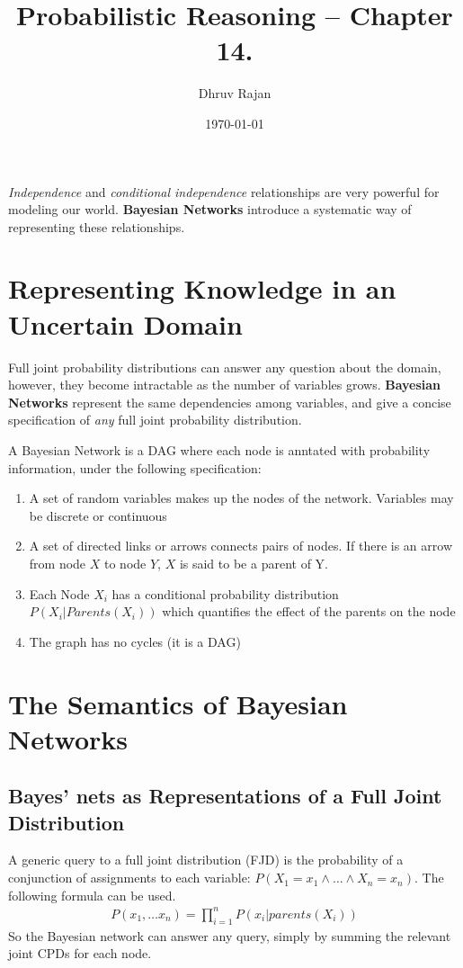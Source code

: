 \documentclass[12pt]{article}
\begin{document}
\title{Probabilistic Reasoning -- Chapter 14.}
\author{Dhruv Rajan}
\date{\today}
\maketitle

\textit{Independence} and \textit{conditional independence}
relationships are very powerful for modeling our
world. \textbf{Bayesian Networks} introduce a systematic way of
representing these relationships.

\section{Representing Knowledge in an Uncertain Domain}
Full joint probability distributions can answer any question about the
domain, however, they become intractable as the number of variables
grows. \textbf{Bayesian Networks} represent the same dependencies
among variables, and give a concise specification of \textit{any} full
joint probability distribution.

A Bayesian Network is a DAG where each node is anntated with
probability information, under the following specification:
\begin{enumerate}
\item A set of random variables makes up the nodes of the
  network. Variables may be discrete or continuous
\item A set of directed links or arrows connects pairs of nodes. If
  there is an arrow from node $X$ to node $Y$, $X$ is said to be a
  parent of Y.
\item Each Node $X_i$ has a conditional probability distribution
  $P(X_i | Parents(X_i))$ which quantifies the effect of the parents
  on the node
\item The graph has no cycles (it is a DAG)
\end{enumerate}

\section{The Semantics of Bayesian Networks}
\subsection{Bayes' nets as Representations of a Full Joint Distribution}
A generic query to a full joint distribution (FJD) is the probability
of a conjunction of assignments to each variable:
$P(X_1 = x_1 \land \dots \land X_n = x_n)$. The following formula can
be used.
\begin{align*}
  P(x_1, \dots x_n) = \prod_{i = 1}^{n} P(x_i | parents(X_i))
\end{align*}
So the Bayesian network can answer any query, simply by summing the
relevant joint CPDs for each node.
\end{document}
